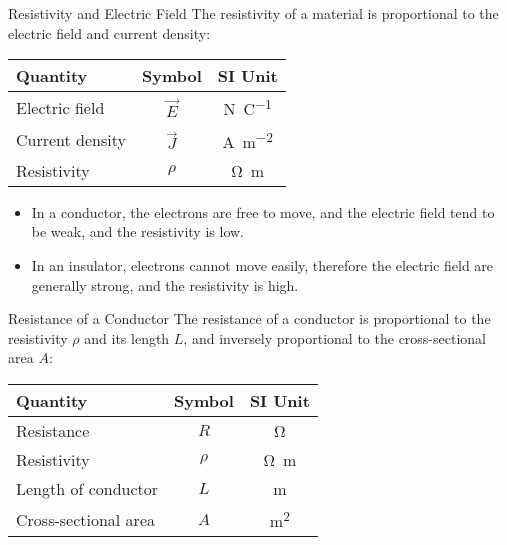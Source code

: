 \documentclass[12pt,aspectratio=169]{beamer}
\begin{document}
\begin{frame}{Resistivity and Electric Field}
  The resistivity of a material is proportional to the electric field and
  current density:

  \begin{center}
    \begin{tabular}{l|c|c}
      \rowcolor{pink}
      \textbf{Quantity} & \textbf{Symbol} & \textbf{SI Unit} \\ \hline
      Electric field & $\vec E$ & \si{\newton\per\coulomb} \\
      Current density & $\vec J$ & \si{\ampere\per\metre\squared} \\
      Resistivity & $\rho$ & \si{\ohm\metre}
    \end{tabular}
  \end{center}
  \begin{itemize}
  \item In a conductor, the electrons are free to move, and the electric
    field tend to be weak, and the resistivity is low.
  \item In an insulator, electrons cannot move easily, therefore the electric
    field are generally strong, and the resistivity is high.
  \end{itemize}
\end{frame}



\begin{frame}{Resistance of a Conductor}
  The resistance of a conductor is proportional to the resistivity $\rho$ and
  its length $L$, and inversely proportional to the cross-sectional area $A$:

  \begin{center}
    \begin{tabular}{l|c|c}
      \rowcolor{pink}
      \textbf{Quantity} & \textbf{Symbol} & \textbf{SI Unit} \\ \hline
      Resistance           & $R$    & \si\ohm \\
      Resistivity          & $\rho$ & \si{\ohm.\metre} \\
      Length of conductor  & $L$    & \si\metre \\
      Cross-sectional area & $A$    & \si{\metre\squared}
    \end{tabular}
  \end{center}
\end{frame}
\end{document}
